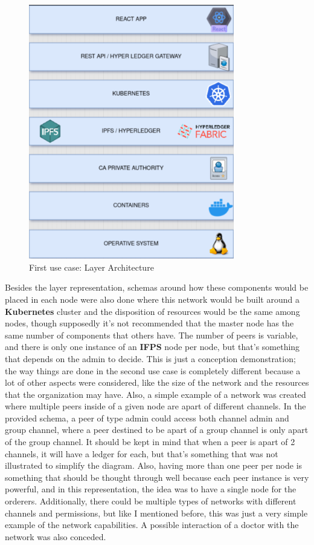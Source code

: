\begin{figure}[H]
    \centering
    \includegraphics[width=0.8\textwidth]{assets/use-case-1/Layer.png} %
    \caption{First use case: Layer Architecture}
    \label{fig:sample-image} 
\end{figure}

Besides the layer representation, schemas around how these components would be placed in each node were also done where this network would be built around a \textbf{Kubernetes} cluster and the disposition of resources would be the same among nodes, though supposedly it's not recommended that the master node has the same number of components that others have. The number of peers is variable, and there is only one instance of an \textbf{IFPS} node per node, but that's something that depends on the admin to decide. This is just a conception demonstration; the way things are done in the second use case is completely different because a lot of other aspects were considered, like the size of the network and the resources that the organization may have. Also, a simple example of a network was created where multiple peers inside of a given node are apart of different channels. In the provided schema, a peer of type admin could access both channel admin and group channel, where a peer destined to be apart of a group channel is only apart of the group channel. It should be kept in mind that when a peer is apart of 2 channels, it will have a ledger for each, but that's something that was not illustrated to simplify the diagram. Also, having more than one peer per node is something that should be thought through well because each peer instance is very powerful, and in this representation, the idea was to have a single node for the orderers. Additionally, there could be multiple types of networks with different channels and permissions, but like I mentioned before, this was just a very simple example of the network capabilities. A possible interaction of a doctor with the network was also conceded.

